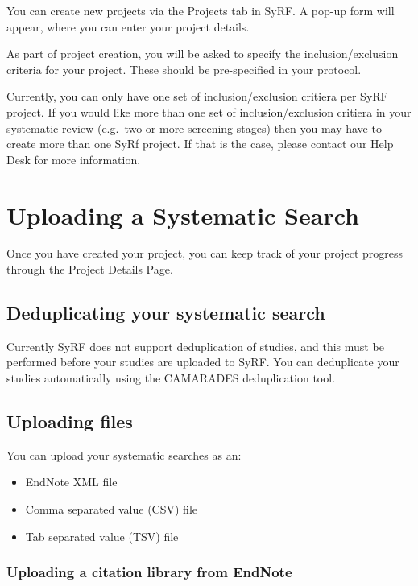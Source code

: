 \documentclass[
]{book}
\providecommand{\tightlist}{%
  \setlength{\itemsep}{0pt}\setlength{\parskip}{0pt}}
\begin{document}
You can create new projects via the Projects tab in SyRF. A pop-up form will appear, where you can enter your project details.

As part of project creation, you will be asked to specify the inclusion/exclusion criteria for your project. These should be pre-specified in your protocol.

Currently, you can only have one set of inclusion/exclusion critiera per SyRF project. If you would like more than one set of inclusion/exclusion critiera in your systematic review (e.g.~two or more screening stages) then you may have to create more than one SyRf project. If that is the case, please contact our Help Desk for more information.

\hypertarget{systematicSearch}{%
\chapter{Uploading a Systematic Search}\label{systematicSearch}}

Once you have created your project, you can keep track of your project progress through the Project Details Page.

\hypertarget{deduplicating-your-systematic-search}{%
\section{Deduplicating your systematic search}\label{deduplicating-your-systematic-search}}

Currently SyRF does not support deduplication of studies, and this must be performed before your studies are uploaded to SyRF. You can deduplicate your studies automatically using the CAMARADES deduplication tool.

\hypertarget{uploading-files}{%
\section{Uploading files}\label{uploading-files}}

You can upload your systematic searches as an:

\begin{itemize}
\tightlist
\item
  EndNote XML file
\item
  Comma separated value (CSV) file
\item
  Tab separated value (TSV) file
\end{itemize}

\hypertarget{uploading-a-citation-library-from-endnote}{%
\subsection{Uploading a citation library from EndNote}\label{uploading-a-citation-library-from-endnote}}
\end{document}
